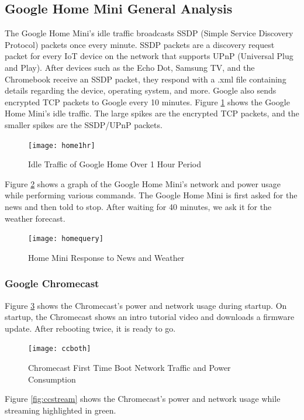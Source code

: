 \subsection{Google Home Mini General Analysis}
The Google Home Mini's idle traffic broadcasts SSDP (Simple Service Discovery Protocol) packets once every minute. SSDP packets are a discovery request packet for every IoT device on the network that supports UPnP (Universal Plug and Play). After devices such as the Echo Dot, Samsung TV, and the Chromebook receive an SSDP packet, they respond with a .xml file containing details regarding the device, operating system, and more. Google also sends encrypted TCP packets to Google every 10 minutes. Figure \ref{fig:home} shows the Google Home Mini's idle traffic. The large spikes are the encrypted TCP packets, and the smaller spikes are the SSDP/UPnP packets.

\begin{figure}[H]
  \centering
    \texttt{[image: home1hr]}
  \caption{Idle Traffic of Google Home Over 1 Hour Period}
  \label{fig:home}
\end{figure}

Figure \ref{fig:homequery} shows a graph of the Google Home Mini's network and power usage while performing various commands. The Google Home Mini is first asked for the news and then told to stop. After waiting for 40 minutes, we ask it for the weather forecast.

\begin{figure}[H]
  \centering
    \texttt{[image: homequery]}
  \caption{Home Mini Response to News and Weather}
  \label{fig:homequery}
\end{figure}

\subsubsection{Google Chromecast}
Figure \ref{fig:ccboth} shows the Chromecast's power and network usage during startup. On startup, the Chromecast shows an intro tutorial video and downloads a firmware update. After rebooting twice, it is ready to go.

\begin{figure}[H]
  \centering
  \texttt{[image: ccboth]}
  \caption{Chromecast First Time Boot Network Traffic and Power Consumption}
  \label{fig:ccboth}
\end{figure}

Figure \ref{fig:ccstream} shows the Chromecast's power and network usage while streaming highlighted in green.

